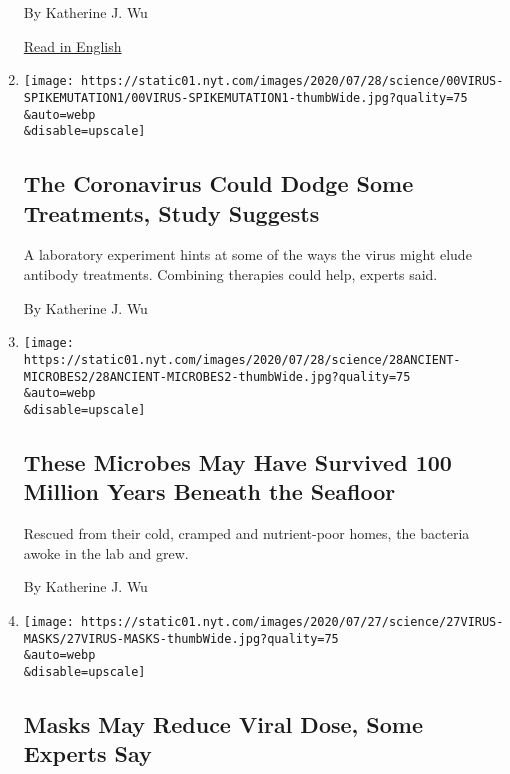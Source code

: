 \begin{enumerate}
  By Katherine J. Wu

  \href{https://www.nytimes.com/2020/07/27/health/coronavirus-mask-protection.html}{Read
  in English}
\item
  \href{/2020/07/28/health/coronavirus-mutation-spike-treatment.html}{}

  \texttt{[image: https://static01.nyt.com/images/2020/07/28/science/00VIRUS-SPIKEMUTATION1/00VIRUS-SPIKEMUTATION1-thumbWide.jpg?quality=75\\\&auto=webp\\\&disable=upscale]}

  \hypertarget{the-coronavirus-could-dodge-some-treatments-study-suggests}{%
  \subsection{The Coronavirus Could Dodge Some Treatments, Study
  Suggests}\label{the-coronavirus-could-dodge-some-treatments-study-suggests}}

  A laboratory experiment hints at some of the ways the virus might
  elude antibody treatments. Combining therapies could help, experts
  said.

  By Katherine J. Wu
\item
  \href{/2020/07/28/science/microbes-100-million-years-old.html}{}

  \texttt{[image: https://static01.nyt.com/images/2020/07/28/science/28ANCIENT-MICROBES2/28ANCIENT-MICROBES2-thumbWide.jpg?quality=75\\\&auto=webp\\\&disable=upscale]}

  \hypertarget{these-microbes-may-have-survived-100-million-years-beneath-the-seafloor}{%
  \subsection{These Microbes May Have Survived 100 Million Years Beneath
  the
  Seafloor}\label{these-microbes-may-have-survived-100-million-years-beneath-the-seafloor}}

  Rescued from their cold, cramped and nutrient-poor homes, the bacteria
  awoke in the lab and grew.

  By Katherine J. Wu
\item
  \href{/2020/07/27/health/coronavirus-mask-protection.html}{}

  \texttt{[image: https://static01.nyt.com/images/2020/07/27/science/27VIRUS-MASKS/27VIRUS-MASKS-thumbWide.jpg?quality=75\\\&auto=webp\\\&disable=upscale]}

  \hypertarget{masks-may-reduce-viral-dose-some-experts-say}{%
  \subsection{Masks May Reduce Viral Dose, Some Experts
  Say}\label{masks-may-reduce-viral-dose-some-experts-say}}


\end{enumerate}
